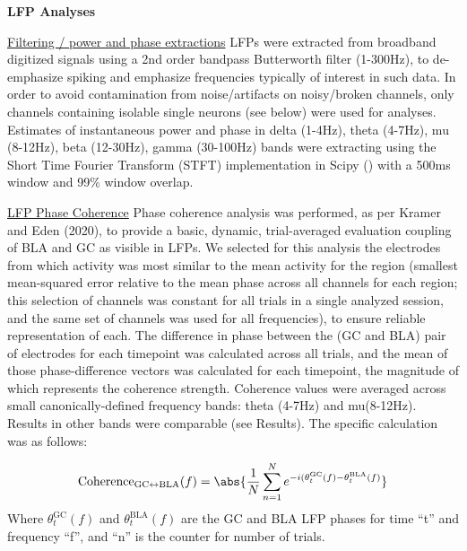 \begin{refsection}
\smallskip
\noindent\textbf{LFP Analyses}\par

\noindent\underline{Filtering / power and phase extractions}
LFPs were extracted from broadband digitized signals using a 2nd order bandpass Butterworth filter (1-300Hz), to de-emphasize spiking and emphasize frequencies typically of interest in such data. In order to avoid contamination from noise/artifacts on noisy/broken channels, only channels containing isolable single neurons (see below) were used for analyses. Estimates of instantaneous power and phase in delta (1-4Hz), theta (4-7Hz), mu (8-12Hz), beta (12-30Hz), gamma (30-100Hz) bands were extracting using the Short Time Fourier Transform (STFT) implementation in Scipy (\cite{p2020a}) with a 500ms window and 99\% window overlap.

\smallskip
\noindent\underline{LFP Phase Coherence}
Phase coherence analysis was performed, as per Kramer and Eden (2020), to provide a basic, dynamic, trial-averaged evaluation coupling of BLA and GC as visible in LFPs. We selected for this analysis the electrodes from which activity was most similar to the mean activity for the region (smallest mean-squared error relative to the mean phase across all channels for each region; this selection of channels was constant for all trials in a single analyzed session, and the same set of channels was used for all frequencies), to ensure reliable representation of each. The difference in phase between the (GC and BLA) pair of electrodes for each timepoint was calculated across all trials, and the mean of those phase-difference vectors was calculated for each timepoint, the magnitude of which represents the coherence strength.  Coherence values were averaged across small canonically-defined frequency bands: theta (4-7Hz) and mu(8-12Hz). Results in other bands were comparable (see Results). The specific calculation was as follows:

$$\text{Coherence}_{\text{GC}\leftrightarrow\text{BLA}}(f)=\abs{\frac{1}{N}\sum_{n=1}^{N}e^{-i(\theta_t^\text{GC}(f)-\theta_t^\text{BLA}(f)}}$$
\noindent Where \(\theta_t^\text{GC}(f)\) and \(\theta_t^\text{BLA}(f)\) are the GC and BLA LFP phases for time “t” and frequency “f”, and “n” is the counter for number of trials.


\end{refsection}
